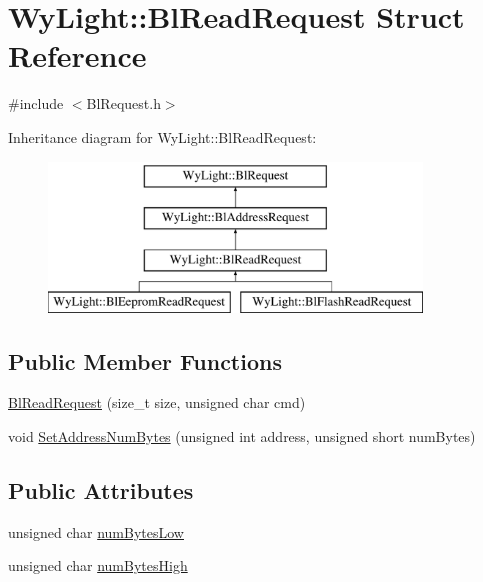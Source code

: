 \hypertarget{struct_wy_light_1_1_bl_read_request}{\section{Wy\-Light\-:\-:Bl\-Read\-Request Struct Reference}
\label{struct_wy_light_1_1_bl_read_request}
}


{\ttfamily \#include $<$Bl\-Request.\-h$>$}

Inheritance diagram for Wy\-Light\-:\-:Bl\-Read\-Request\-:\begin{figure}[H]
\begin{center}
\leavevmode
\includegraphics[height=4.000000cm]{struct_wy_light_1_1_bl_read_request}
\end{center}
\end{figure}
\subsection*{Public Member Functions}
\begin{DoxyCompactItemize}
\item 
\hyperlink{struct_wy_light_1_1_bl_read_request_ab9f77571421d6f5cde7e54a3396e0f37}{Bl\-Read\-Request} (size\-\_\-t size, unsigned char cmd)
\item 
void \hyperlink{struct_wy_light_1_1_bl_read_request_a84b7b977397f292a5dee65fcbf4d5c1f}{Set\-Address\-Num\-Bytes} (unsigned int address, unsigned short num\-Bytes)
\end{DoxyCompactItemize}
\subsection*{Public Attributes}
\begin{DoxyCompactItemize}
\item 
unsigned char \hyperlink{struct_wy_light_1_1_bl_read_request_afcf7c581f226c10726999e4aca344137}{num\-Bytes\-Low}
\item 
unsigned char \hyperlink{struct_wy_light_1_1_bl_read_request_abaf19abf5aa4e5e787eae732210b5c81}{num\-Bytes\-High}
\end{DoxyCompactItemize}


